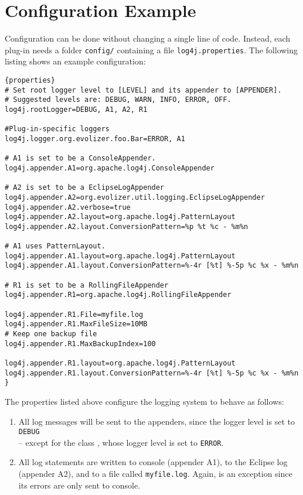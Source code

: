\documentclass{seal_article}
\begin{document}
\newpage

\section{Configuration Example}
\label{config}

Configuration can be done without changing a single line of code. Instead, each plug-in needs a folder \texttt{config/} containing a file \texttt{log4j.properties}. The following listing shows an example configuration:\\

\lstset{language=bash}
\begin{lstlisting}[frame=tbrl, caption=log4j.properties -- Configuration]{properties}
# Set root logger level to [LEVEL] and its appender to [APPENDER].
# Suggested levels are: DEBUG, WARN, INFO, ERROR, OFF.
log4j.rootLogger=DEBUG, A1, A2, R1

#Plug-in-specific loggers
log4j.logger.org.evolizer.foo.Bar=ERROR, A1

# A1 is set to be a ConsoleAppender.
log4j.appender.A1=org.apache.log4j.ConsoleAppender

# A2 is set to be a EclipseLogAppender
log4j.appender.A2=org.evolizer.util.logging.EclipseLogAppender
log4j.appender.A2.verbose=true
log4j.appender.A2.layout=org.apache.log4j.PatternLayout
log4j.appender.A2.layout.ConversionPattern=%p %t %c - %m%n

# A1 uses PatternLayout.
log4j.appender.A1.layout=org.apache.log4j.PatternLayout
log4j.appender.A1.layout.ConversionPattern=%-4r [%t] %-5p %c %x - %m%n

# R1 is set to be a RollingFileAppender
log4j.appender.R1=org.apache.log4j.RollingFileAppender

log4j.appender.R1.File=myfile.log
log4j.appender.R1.MaxFileSize=10MB
# Keep one backup file
log4j.appender.R1.MaxBackupIndex=100

log4j.appender.R1.layout=org.apache.log4j.PatternLayout
log4j.appender.R1.layout.ConversionPattern=%-4r [%t] %-5p %c %x - %m%n
}
\end{lstlisting}

\newpage

The properties listed above configure the logging system to behave as follows:

\begin{enumerate}
\item{All log messages will be sent to the appenders, since the logger level is set to \texttt{DEBUG} \\-- except for the class , whose logger level is set to \texttt{ERROR}.}
\item{All log statements are written to console (appender A1), to the Eclipse log (appender A2), and to a file called \texttt{myfile.log}. Again,  is an exception since its errors are only sent to console.}
\end{enumerate}
\end{document}
